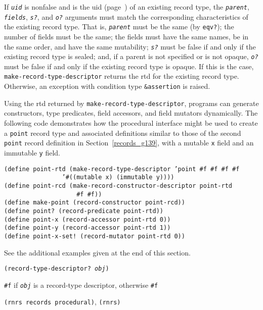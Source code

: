 If \texttt{\textit{uid}} is nonfalse and is the uid (page \pageref{records_page_record_uid})
of an existing record type, the \texttt{\textit{parent}}, \texttt{\textit{fields}}, \texttt{\textit{s?}},
and \texttt{\textit{o?}} arguments must match the corresponding characteristics
of the existing record type.
That is, \texttt{\textit{parent}} must be the same (by \texttt{eqv?}); the number
of fields must be the same; the fields must
have the same names, be in the same order, and have the same mutability;
\texttt{\textit{s?}} must be false if and only
if the existing record type is sealed; and, if a parent is not specified
or is not opaque, \texttt{\textit{o?}} must be false if and only if the existing
record type is opaque.
If this is the case, \texttt{make-record-type-descriptor}
returns the rtd for the existing record type.
Otherwise, an exception with condition type \texttt{\&{}assertion} is raised.


Using the rtd returned by \texttt{make-record-type-descriptor}, programs
can generate constructors,
type predicates, field accessors, and field mutators dynamically.
The following code demonstrates how the procedural interface might
be used to create a \texttt{point} record type and associated
definitions similar to those of the second \texttt{point} record
definition in Section \ref{records_g139}, with a mutable
\texttt{x} field and an immutable \texttt{y} field.


\begin{alltt}
(define point-rtd (make-record-type-descriptor 'point \#{}f \#{}f \#{}f \#{}f
                '\#{}((mutable x) (immutable y))))
(define point-rcd (make-record-constructor-descriptor point-rtd
                    \#{}f \#{}f))
(define make-point (record-constructor point-rcd))
(define point? (record-predicate point-rtd))
(define point-x (record-accessor point-rtd 0))
(define point-y (record-accessor point-rtd 1))
(define point-x-set! (record-mutator point-rtd 0))
\end{alltt}


See the additional examples given at the end of this section.


\begin{description}

\label{records_s23}\item[procedure] \texttt{(record-type-descriptor? \textit{obj})}



\item[returns] \texttt{\#{}f} if \texttt{\textit{obj}} is a record-type descriptor, otherwise \texttt{\#{}f}


\item[libraries] \texttt{(rnrs records procedural)}, \texttt{(rnrs)}
\end{description}


